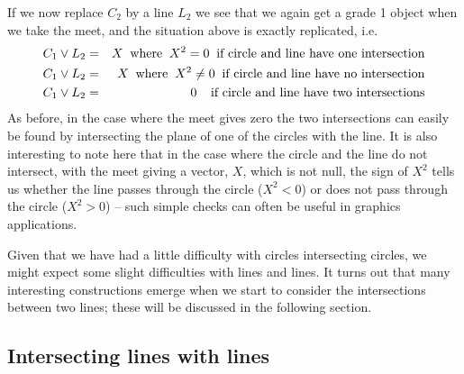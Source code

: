If we now replace $C_2$ by a line $L_2$ we see that we
again get a grade 1 object when we take the meet, and the
situation above is exactly replicated, i.e.
%
\begin{eqnarray}
C_1 \vee L_2  &  =  &  X \;\;\mbox{where}\;\;
X^2=0\;\;\mbox{if circle and line have one intersection} \nonumber \\
C_1 \vee L_2  &  =  &  X \;\;\mbox{where}\;\;
X^2\ne 0\;\;\mbox{if circle and line have no intersection} \nonumber \\
C_1 \vee L_2  &  =  &  0 \;\; \;\;\mbox{if circle and
line have two intersections}
\end{eqnarray}
%
As before, in the case where the meet gives zero the two
intersections can easily be found by intersecting the
plane of one of the circles with the line. It is also
interesting to note here that in the case where the
circle and the line do not intersect, with the meet
giving a vector, $X$, which is not null, the sign of
$X^2$ tells us whether the line passes through the circle
($X^2<0$) or does not pass through the circle ($X^2>0$)
-- such simple checks can often be useful in graphics
applications.


Given that we have had a little difficulty with circles
intersecting circles, we might expect some slight
difficulties with lines and lines. It turns out that many
interesting constructions emerge when we start to
consider the intersections between two lines; these will
be discussed in the following section.


\subsection{Intersecting lines with lines }

